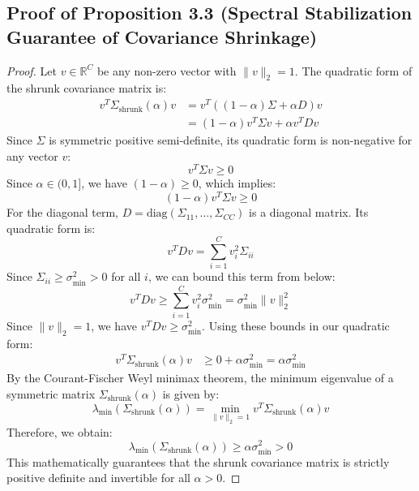 \documentclass{article}
\theoremstyle{plain}
\theoremstyle{definition}
\theoremstyle{remark}
\begin{document}
\subsection{Proof of Proposition 3.3 (Spectral Stabilization Guarantee of Covariance Shrinkage)}
\label{sec:proofs_spectral_stability}
\begin{proof}
Let $v \in \mathbb{R}^C$ be any non-zero vector with $\|v\|_2 = 1$. The quadratic form of the shrunk covariance matrix is:
\begin{align*}
  v^T \Sigma_{\text{shrunk}}(\alpha) v &= v^T \left( (1 - \alpha) \Sigma + \alpha D \right) v \\
  &= (1 - \alpha) v^T \Sigma v + \alpha v^T D v
\end{align*}
Since $\Sigma$ is symmetric positive semi-definite, its quadratic form is non-negative for any vector $v$:
\begin{equation*}
  v^T \Sigma v \geq 0
\end{equation*}
Since $\alpha \in (0, 1]$, we have $(1 - \alpha) \geq 0$, which implies:
\begin{equation*}
  (1 - \alpha) v^T \Sigma v \geq 0
\end{equation*}
For the diagonal term, $D = \text{diag}(\Sigma_{11}, \dots, \Sigma_{CC})$ is a diagonal matrix. Its quadratic form is:
\begin{equation*}
  v^T D v = \sum_{i=1}^C v_i^2 \Sigma_{ii}
\end{equation*}
Since $\Sigma_{ii} \geq \sigma_{\min}^2 > 0$ for all $i$, we can bound this term from below:
\begin{equation*}
  v^T D v \geq \sum_{i=1}^C v_i^2 \sigma_{\min}^2 = \sigma_{\min}^2 \|v\|_2^2
\end{equation*}
Since $\|v\|_2 = 1$, we have $v^T D v \geq \sigma_{\min}^2$.
Using these bounds in our quadratic form:
\begin{align*}
  v^T \Sigma_{\text{shrunk}}(\alpha) v &\geq 0 + \alpha \sigma_{\min}^2 = \alpha \sigma_{\min}^2
\end{align*}
By the Courant-Fischer Weyl minimax theorem, the minimum eigenvalue of a symmetric matrix $\Sigma_{\text{shrunk}}(\alpha)$ is given by:
\begin{equation*}
  \lambda_{\min}\left(\Sigma_{\text{shrunk}}(\alpha)\right) = \min_{\|v\|_2 = 1} v^T \Sigma_{\text{shrunk}}(\alpha) v
\end{equation*}
Therefore, we obtain:
\begin{equation}
  \lambda_{\min}\left(\Sigma_{\text{shrunk}}(\alpha)\right) \geq \alpha \sigma_{\min}^2 > 0
\end{equation}
This mathematically guarantees that the shrunk covariance matrix is strictly positive definite and invertible for all $\alpha > 0$.
\end{proof}
\end{document}
